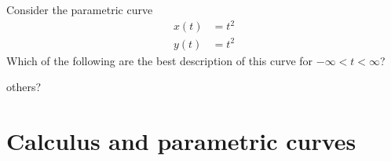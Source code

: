 \documentclass{ximera}
\begin{document}
\begin{question}
  Consider the parametric curve
  \begin{align*}
  x(t) &= t^2\\
  y(t) &=t^2
  \end{align*}
  Which of the following are the best description of this curve for
  $-\infty<t<\infty$?
  \begin{multipleChoice}
  \end{multipleChoice}
\end{question}


others?



\section{Calculus and parametric curves}
\end{document}
